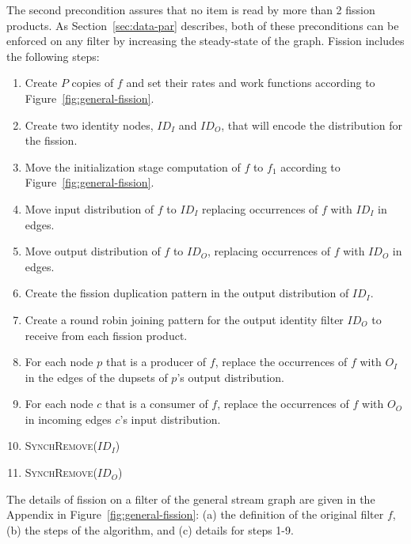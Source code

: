 \noindent The second precondition assures that no item is read by more
than 2 fission products.  As Section~\ref{sec:data-par} describes,
both of these preconditions can be enforced on any filter by
increasing the steady-state of the graph.  Fission includes the
following steps: 
\begin{enumerate}
\item Create $P$ copies of $f$ and set their rates
and work functions according to Figure~\ref{fig:general-fission}.
\item Create two identity nodes, $ID_I$ and $ID_O$, that will encode
  the distribution for the fission.
\item Move the initialization stage computation of $f$ to $f_1$
  according to Figure~\ref{fig:general-fission}. 
\item Move input distribution of $f$ to $ID_I$
replacing occurrences of $f$ with $ID_I$ in edges.
\item Move output distribution of $f$ to $ID_O$, replacing
occurrences of $f$ with $ID_O$ in edges.
\item Create the fission duplication pattern in the
output distribution of $ID_I$.
\item Create a round robin joining pattern for the output identity
  filter $ID_O$ to receive from each fission product.
\item For each node $p$ that is a producer of $f$, replace the
 occurrences of $f$ with $O_I$ in the edges of the dupsets of $p$'s
 output distribution.
\item For each node $c$ that is a consumer of $f$, replace the
 occurrences of $f$ with $O_O$ in incoming edges $c$'s input
 distribution.
\item \textsc{SynchRemove}($ID_I$)
\item \textsc{SynchRemove}($ID_O$)
\end{enumerate}

The details of fission on a filter of the general stream graph are
given in the Appendix in Figure~\ref{fig:general-fission}: (a) the
definition of the original filter $f$, (b) the steps of the algorithm,
and (c) details for steps 1-9.

